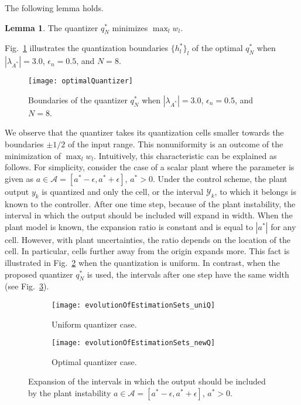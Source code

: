 \documentclass[a4paper, 11pt]{article}
\newcommand{\calY}{\mathcal{Y}}
\newcommand{\calA}{\mathcal{A}}
\newcommand{\lambdaAS}{\lambda_{A^*}\!}
\theoremstyle{definition}
\newtheorem{lem}{Lemma}
\newcommand{\fref}[1]{Fig.~\ref{#1}}
\begin{document}
The following lemma holds.
\begin{lem}\label{lem,opt_q}
 The quantizer $q^*_N$ minimizes $\max_lw_l$.
\end{lem}

\fref{fig,q^*} illustrates the quantization boundaries $\{h^*_l\}_l$ of
the optimal $q^*_N$ when $|\lambdaAS|=3.0$, $\epsilon_n=0.5$, and $N=8$.
\begin{figure}[tbp]
 \centering
 \texttt{[image: optimalQuantizer]}
 \caption{Boundaries of the quantizer $q^*_N$ when $|\lambdaAS|=3.0$,
 $\epsilon_n=0.5$, and $N=8$.}
\label{fig,q^*}
\end{figure}
We observe that the quantizer takes its quantization cells smaller towards
the boundaries $\pm1/2$ of the input range.
This nonuniformity is an outcome of the minimization of $\max_l w_l$.
Intuitively, this characteristic can be explained as follows.
For simplicity, consider the case of a scalar plant where the parameter
is given as $a\in\calA=[a^*-\epsilon,a^*+\epsilon]$, $a^*>0$.
Under the control scheme, the plant output $y_k$ is quantized and only the cell,
or the interval $\calY_{k}$, to which it belongs is known to the controller.
After one time step, because of the plant instability, the interval in which
the output should be included will expand in width.
When the plant model is known, the expansion ratio is constant and is equal
to $|a^*|$ for any cell.
However, with plant uncertainties, the ratio depends on the location
of the cell.
In particular, cells further away from the origin expands more.
This fact is illustrated in \fref{fig,AYuni} when the quantization is uniform.
In contrast, when the proposed quantizer $q^*_N$ is used, the intervals
after one step have the same width (see \fref{fig,AYopt}).
\begin{figure}[t]
 \begin{subfigure}{\linewidth}
  \centering
  \texttt{[image: evolutionOfEstimationSets\_uniQ]}
  \caption{Uniform quantizer case.} \label{fig,AYuni}
 \end{subfigure}
 \begin{subfigure}{\linewidth}
  \centering
  \texttt{[image: evolutionOfEstimationSets\_newQ]}
  \caption{Optimal quantizer case.} \label{fig,AYopt}
 \end{subfigure}
 \caption{Expansion of the intervals in which the output should be included 
 by the plant instability $a\in\calA=[a^*-\epsilon,a^*+\epsilon]$, $a^*>0$.}
 \label{fig,AY}
\end{figure}
 
\end{document}
